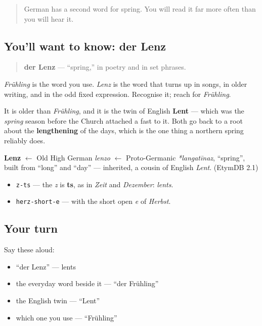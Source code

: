 \label{lesson:GE-C09-lenz}



\begin{quote}
German has a second word for spring. You will read it far more often than you will hear it.
\end{quote}

\subsection*{You'll want to know: der Lenz}
\begin{quote}
\textbf{der Lenz} — \textquotedblleft{}spring,\textquotedblright{} in poetry and in set phrases.
\end{quote}

\emph{Frühling} is the word you use. \emph{Lenz} is the word that turns up in songs, in older writing, and in the odd fixed expression. Recognise it; reach for \emph{Frühling}.

It is older than \emph{Frühling}, and it is the twin of English \textbf{Lent} — which was the \emph{spring} season before the Church attached a fast to it. Both go back to a root about the \textbf{lengthening} of the days, which is the one thing a northern spring reliably does.

\begin{cousinweb}
\textbf{Lenz} $\leftarrow$ Old High German \emph{lenzo} $\leftarrow$ Proto-Germanic \emph{*langatīnaz}, \textquotedblleft{}spring\textquotedblright{}, built from \textquotedblleft{}long\textquotedblright{} and \textquotedblleft{}day\textquotedblright{} — inherited, a cousin of English \emph{Lent}. (EtymDB 2.1)
\end{cousinweb}

\begin{sounds}
\begin{itemize}
\raggedright
  \item \texttt{z-ts} — the \emph{z} is \textbf{ts}, as in \emph{Zeit} and \emph{Dezember}: \emph{lents}.
  \item \texttt{herz-short-e} — with the short open \emph{e} of \emph{Herbst}.
\end{itemize}
\end{sounds}

\subsection*{Your turn}
Say these aloud:

\begin{itemize}
\raggedright
  \item \textquotedblleft{}der Lenz\textquotedblright{} — lents
  \item the everyday word beside it — \textquotedblleft{}der Frühling\textquotedblright{}
  \item the English twin — \textquotedblleft{}Lent\textquotedblright{}
  \item which one you use — \textquotedblleft{}Frühling\textquotedblright{}
\end{itemize}

